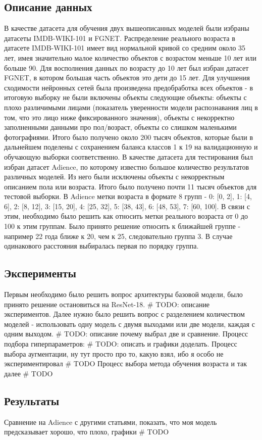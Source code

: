 \subsection*{Описание данных}
В качестве датасета для обучения двух вышеописанных моделей были избраны датасеты IMDB-WIKI-101 и FGNET\@.
Распределение реального возраста в датасете IMDB-WIKI-101 имеет вид нормальной кривой со средним около 35 лет, имея значительно малое количество объектов с возрастом меньше 10 лет или больше 90.
Для восполнения данных по возрасту до 10 лет был избран датасет FGNET, в котором большая часть объектов это дети до 15 лет.
Для улучшения сходимости нейронных сетей была произведена предобработка всех объектов - в итоговую выборку не были включены объекты следующие объекты: объекты с плохо различимыми лицами (показатель уверенности модели распознавания лиц в том, что это лицо ниже фиксированного значения), объекты с некорректно заполненными данными про пол/возраст, объекты со слишком маленькими фотографиями.
Итого было получено около 200 тысяч объектов, которые были в дальнейшем поделены с сохранением баланса классов 1 к 19 на валидационную и обучающую выборки соответственно.
В качестве датасета для тестирования был избран датасет Adience, по которому известно большое количество результатов различных моделей.
Из него были исключены объекты с некорректным описанием пола или возраста.
Итого было получено почти 11 тысяч объектов для тестовой выборки.
В Adience метки возраста в формате 8 групп - 0: [0, 2], 1: [4, 6], 2: [8, 12], 3: [15, 20], 4: [25, 32], 5: [38, 43], 6: [48, 53], 7: [60, 100].
В связи с этим, необходимо было решить как относить метки реального возраста от 0 до 100 к этим группам.
Было принято решение относить к ближайшей группе - например 22 года ближе к 20, чем к 25, следовательно группа 3.
В случае одинакового расстояния выбиралась первая по порядку группа.

\subsection*{Эксперименты}
Первым необходимо было решить вопрос архитектуры базовой модели, было принято решение остановиться на ResNet-18.
# TODO: описание экспериментов.
Далее нужно было решить вопрос с разделением количеством моделей - использовать одну модель с двумя выходами или две модели, каждая с одним выходом.
# TODO: описание почему выбрал две и сравнение.
Процесс подбора гиперпараметров: # TODO: описать и графики доделать.
Процесс выбора аугментации, ну тут просто про то, какую взял, ибо я особо не экспериментировал # TODO
Процесс выбора метода обучения возраста и так далее # TODO

\subsection*{Результаты}
Сравнение на Adience с другими статьями, показать, что моя модель предсказывает хорошо, что плохо, графики # TODO